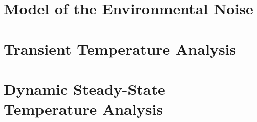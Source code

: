 \documentclass[conference]{IEEEtran}
\begin{document}
  \section{Model of the Environmental Noise} 
  


  \section{Transient Temperature Analysis} 
  

  \section{Dynamic Steady-State Temperature Analysis} 
  

  
  
\end{document}
